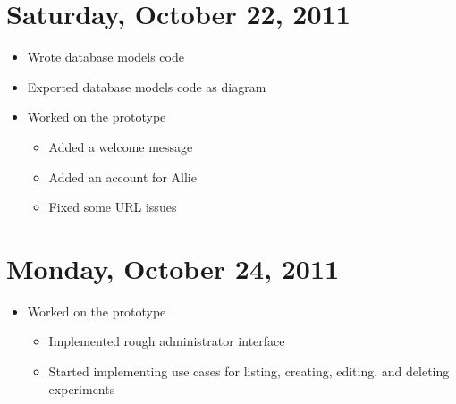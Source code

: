 \documentclass{article}
\begin{document}
\section{Saturday, October 22, 2011}
\begin{itemize}
\item Wrote database models code
\item Exported database models code as diagram
\item Worked on the prototype
    \begin{itemize}
    \item Added a welcome message
    \item Added an account for Allie
    \item Fixed some URL issues
    \end{itemize}
\end{itemize}

\section{Monday, October 24, 2011}
\begin{itemize}
\item Worked on the prototype
    \begin{itemize}
    \item Implemented rough administrator interface
    \item Started implementing use cases for listing, creating, editing, and deleting experiments
    \end{itemize}
\end{itemize}
\end{document}
